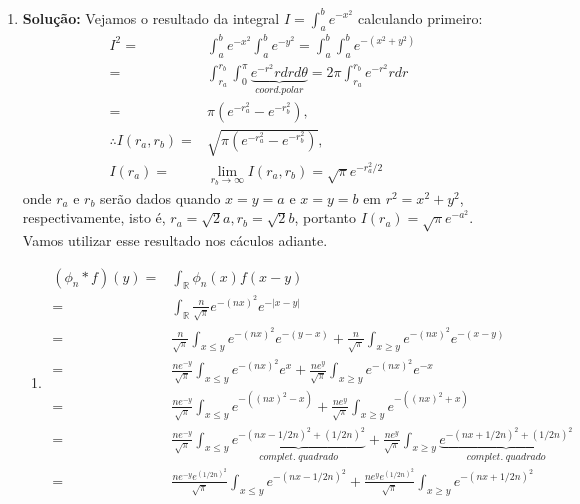 \documentclass{article}
\begin{document}
\begin{enumerate}
		\item \textbf{Solução:} Vejamos o resultado da integral $I = \int_{a}^{b} e^{-x^{2}}$ calculando primeiro:
		$$
		\begin{aligned}
		I^{2} = & \int_{a}^{b} e^{-x^{2}}\int_{a}^{b} e^{-y^{2}} = \int_{a}^{b} \int_{a}^{b} e^{-(x^{2}+y^{2})} 
		\\
		= & \int_{r_{a}}^{r_{b}} \int_{0}^{\pi} \underbrace{ e^{-r^{2}}r dr d\theta }_{coord. polar} = 2\pi \int_{r_{a}}^{r_{b}} e^{-r^{2}}r dr
		\\
		= & \pi (e^{-r_{a}^{2}} - e^{-r_{b}^{2}}),
		\\
		\therefore I(r_{a}, r_{b}) = & \sqrt{\pi (e^{-r_{a}^{2}} - e^{-r_{b}^{2}})},
		\\
		I(r_{a}) = & \lim_{r_{b} \to \infty} I(r_{a}, r_{b}) = \sqrt{\pi} e^{-r_{a}^{2}/2}
		\end{aligned}
		$$
		onde $r_{a}$ e $r_{b}$ serão dados quando $x=y=a$ e $x=y=b$ em  $r^{2} = x^{2}+y^{2}$, respectivamente, isto é, $r_{a} = \sqrt{2}a, r_{b} = \sqrt{2}b$, portanto $I(r_{a}) = \sqrt{\pi}e^{-a^{2}}$. Vamos utilizar esse resultado nos cáculos adiante.
			\begin{enumerate}
				\item
					$$
					\begin{aligned}
					(\phi_{n}*f)(y) = &\int_{\mathbb{R}} \phi_{n}(x)f(x-y)
					\\
					= &\int_{\mathbb{R}} \frac{n}{\sqrt{\pi}}e^{-(nx)^{2}} e^{-|x-y|}
					\\
					= & \frac{n}{\sqrt{\pi}}\int_{x \leq y} e^{-(nx)^{2}} e^{-(y-x)} + \frac{n}{\sqrt{\pi}}\int_{x \geq y} e^{-(nx)^{2}} e^{-(x-y)}
					\\
					= & \frac{ne^{-y}}{\sqrt{\pi}}\int_{x \leq y} e^{-(nx)^{2}} e^{x} + \frac{ne^{y}}{\sqrt{\pi}}\int_{x \geq y} e^{-(nx)^{2}} e^{-x}
					\\
					= & \frac{ne^{-y}}{\sqrt{\pi}}\int_{x \leq y} e^{-((nx)^{2} -x)}  + \frac{ne^{y}}{\sqrt{\pi}}\int_{x \geq y} e^{-((nx)^{2}+x)}
					\\
					= & \frac{ne^{-y}}{\sqrt{\pi}}\int_{x \leq y} \underbrace{ e^{-(nx - 1/2n)^{2} + (1/2n)^{2} }}_{complet. \; quadrado} + \frac{ne^{y}}{\sqrt{\pi}}\int_{x \geq y} \underbrace{ e^{-(nx + 1/2n)^{2} + (1/2n)^{2}} }_{complet.\;quadrado}
					\\
					= & \frac{ne^{-y}e^{ (1/2n)^{2}}}{\sqrt{\pi}}\int_{x \leq y} e^{-(nx - 1/2n)^{2}} + \frac{ne^{y}e^{ (1/2n)^{2}}}{\sqrt{\pi}}\int_{x \geq y} e^{-(nx + 1/2n)^{2}}
					\\

\end{aligned}$$
\end{enumerate}
\end{enumerate}
\end{document}
